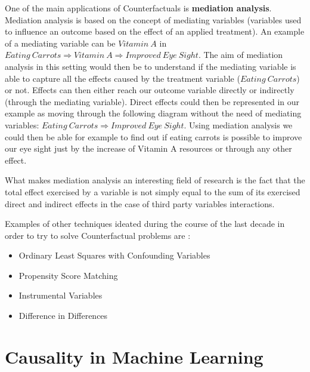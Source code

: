 
One of the main applications of Counterfactuals is \textbf{mediation analysis}. Mediation analysis is based on the concept of mediating variables (variables used to influence an outcome based on the effect of an applied treatment). An example of a mediating variable can be $Vitamin\:A$ in $Eating\:Carrots \Rightarrow Vitamin\:A \Rightarrow Improved\:Eye\:Sight$. The aim of mediation analysis in this setting would then be to understand if the mediating variable is able to capture all the effects caused by the treatment variable ($Eating\:Carrots$) or not. Effects can then either reach our outcome variable directly or indirectly (through the mediating variable). Direct effects could then be represented in our example as moving through the following diagram without the need of mediating variables: $Eating\:Carrots \Rightarrow Improved\:Eye\:Sight$. Using mediation analysis we could then be able for example to find out if eating carrots is possible to improve our eye sight just by the increase of Vitamin A resources or through any other effect.

What makes mediation analysis an interesting field of research is the fact that the total effect exercised by a variable is not simply equal to the sum of its exercised direct and indirect effects in the case of third party variables interactions.

Examples of other techniques ideated during the course of the last decade in order to try to solve Counterfactual problems are \cite{eva}:

\begin{itemize}
    \item Ordinary Least Squares with Confounding Variables
    \item Propensity Score Matching
    \item Instrumental Variables
    \item Difference in Differences
\end{itemize}

\section{Causality in Machine Learning}

